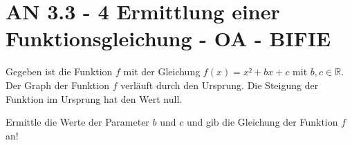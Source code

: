 \section{AN 3.3 - 4 Ermittlung einer Funktionsgleichung - OA - BIFIE}

\begin{beispiel}[AN 3.3]{1} %
				Gegeben ist die Funktion $f$ mit der Gleichung $f(x)=x²+bx+c$ mit $b,c\in\mathbb{R}$.
Der Graph der Funktion $f$ verläuft durch den Ursprung. Die Steigung der Funktion im Ursprung hat den Wert null.

Ermittle die Werte der Parameter $b$ und $c$ und gib die Gleichung der Funktion $f$ an!
\leer

\end{beispiel}